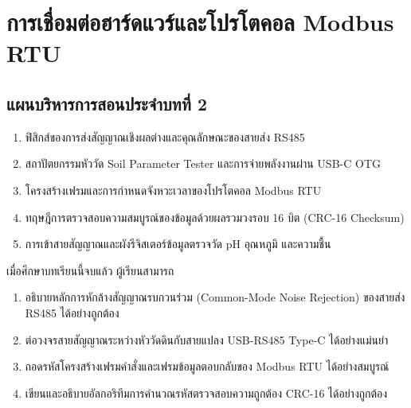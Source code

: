 \chapter{การเชื่อมต่อฮาร์ดแวร์และโปรโตคอล Modbus RTU}
\label{chap:ch02}

\section*{แผนบริหารการสอนประจำบทที่ 2}

\begin{tcolorbox}[
    enhanced, breakable,
    colback=white, colframe=rbruNavy,
    fonttitle=\bfseries\color{white},
    title={1. หัวข้อเนื้อหาประจำบท},
    arc=1.5mm, boxrule=0.8pt, leftrule=3.5mm
]
\begin{enumerate}
    \item ฟิสิกส์ของการส่งสัญญาณเชิงผลต่างและคุณลักษณะของสายส่ง RS485
    \item สถาปัตยกรรมหัววัด Soil Parameter Tester และการจ่ายพลังงานผ่าน USB-C OTG
    \item โครงสร้างเฟรมและการกำหนดจังหวะเวลาของโปรโตคอล Modbus RTU
    \item ทฤษฎีการตรวจสอบความสมบูรณ์ของข้อมูลด้วยผลรวมวงรอบ 16 บิต (CRC-16 Checksum)
    \item การเข้าสายสัญญาณและผังรีจิสเตอร์ข้อมูลตรวจวัด pH อุณหภูมิ และความชื้น
\end{enumerate}
\end{tcolorbox}

\begin{tcolorbox}[
    enhanced, breakable,
    colback=white, colframe=rbruNavy,
    fonttitle=\bfseries\color{white},
    title={2. วัตถุประสงค์เชิงพฤติกรรม},
    arc=1.5mm, boxrule=0.8pt, leftrule=3.5mm
]
เมื่อศึกษาบทเรียนนี้จบแล้ว ผู้เรียนสามารถ
\begin{enumerate}
    \item อธิบายหลักการหักล้างสัญญาณรบกวนร่วม (Common-Mode Noise Rejection) ของสายส่ง RS485 ได้อย่างถูกต้อง
    \item ต่อวงจรสายสัญญาณระหว่างหัววัดดินกับสายแปลง USB-RS485 Type-C ได้อย่างแม่นยำ
    \item ถอดรหัสโครงสร้างเฟรมคำสั่งและเฟรมข้อมูลตอบกลับของ Modbus RTU ได้อย่างสมบูรณ์
    \item เขียนและอธิบายอัลกอริทึมการคำนวณรหัสตรวจสอบความถูกต้อง CRC-16 ได้อย่างถูกต้อง
\end{enumerate}
\end{tcolorbox}

